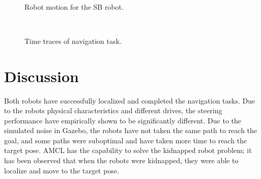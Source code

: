 \documentclass[10pt,journal,compsoc]{IEEEtran}
\begin{document}
\begin{figure}
{        \label{fig:sb4}
    }
    \\
    \caption{Robot motion for the SB robot.}
    \label{fig:sb_motion}
\end{figure}

\begin{figure}
\centering
    \\
    \caption{Time traces of navigation task.}
    \label{fig:time_nav}
\end{figure}



\section{Discussion}

Both robots have successfully localized and completed the navigation tasks. Due to the robots physical characteristics and different drives, the steering performance have empirically shown to be significantly different.  Due to the simulated noise in Gazebo, the robots have not taken the same path to reach the goal, and some paths were suboptimal and have taken more time to reach the target pose. AMCL has the capability to solve the kidnapped robot problem; it has been observed that when the robots were kidnapped, they were able to localize and move to the target pose.   
\end{document}
